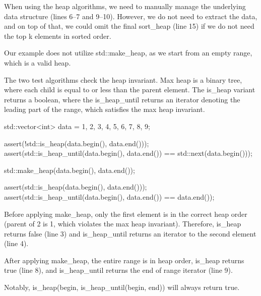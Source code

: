 When using the heap algorithms, we need to manually manage the underlying data structure (lines 6–7 and 9–10). However, we do not need to extract the data, and on top of that, we could omit the final sort\_heap (line 15) if we do not need the top k elements in sorted order.

Our example does not utilize std::make\_heap, as we start from an empty range, which is a valid heap.



The two test algorithms check the heap invariant. Max heap is a binary tree, where each child is equal to or less than the parent element. The is\_heap variant returns a boolean, where the is\_heap\_until returns an iterator denoting the leading part of the range, which satisfies the max heap invariant.

\begin{box-note}
\begin{cppcode}
std::vector<int> data = {1, 2, 3, 4, 5, 6, 7, 8, 9};

assert(!std::is_heap(data.begin(), data.end()));
assert(std::is_heap_until(data.begin(), data.end()) == std::next(data.begin()));

std::make_heap(data.begin(), data.end());

assert(std::is_heap(data.begin(), data.end()));
assert(std::is_heap_until(data.begin(), data.end()) == data.end());
\end{cppcode}
\end{box-note}

Before applying make\_heap, only the first element is in the correct heap order (parent of 2 is 1, which violates the max heap invariant). Therefore, is\_heap returns false (line 3) and is\_heap\_until returns an iterator to the second element (line 4).

After applying make\_heap, the entire range is in heap order, is\_heap returns true (line 8), and is\_heap\_until returns the end of range iterator (line 9).

Notably, is\_heap(begin, is\_heap\_until(begin, end)) will always return true.